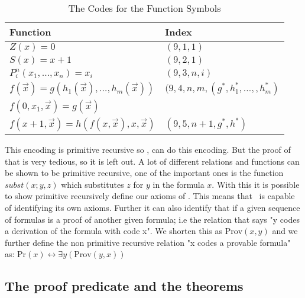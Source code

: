 \documentclass[../main.tex]{subfiles}
\begin{document}
\begin{table}[!ht]
	\centering
\begin{tabular}{|l|l|}\hline
	Function  & Index \\\hline
	 $Z(x)=0$  & $(9,1,1)$ \\ \hline
	 $S(x)=x+1$  & $(9,2,1)$ \\\hline
	 $P^n_i(x_1,\ldots,x_n)=x_i$  & $(9,3,n,i)$ \\\hline
	 $f(\vec{x})=g(h_1(\vec{x}),\ldots,h_m(\vec{x}))$
		       & $(9,4,n,m,(g^*,h_1^*,\ldots,,h_m^*)$ \\\hline
	 $f(0,x_1,\vec{x})=g(\vec{x})$  & \\
	 $f(x+1,\vec{x})=h(f(x,\vec{x}),x,\vec{x})$ &
	 $(9,5,n+1,g^*,h^*)$\\ \hline
\end{tabular}
\caption{The Codes for the Function Symbols}
\end{table}

This encoding is primitive recursive so \PRA, can do this encoding. But the proof of that is very tedious, so
it is left out.
A lot of different relations and functions can be shown to be primitive recursive, one of the
important ones is the function $subst(x;y,z)$ which substitutes $z$ for $y$
in the formula $x$. With this it is possible to show primitive recursively
define our axioms of \PRA. This means that \PRA\ is capable of identifying its
own axioms. Further it can also identify that if a given sequence of formulas
is a proof of another given formula; i.e the relation that says "y codes a
derivation of the formula with code x". We shorten this as $\text{Prov}(x,y)$
and we further define the non primitive recursive relation "x codes a provable
formula" as: $\text{Pr}(x)\leftrightarrow\exists y(\text{Prov}(y,x))$
\subsection{The proof predicate and the theorems}
\end{document}
